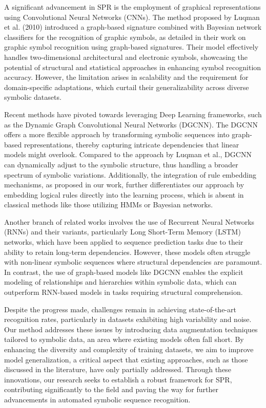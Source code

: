 \documentclass{article}
\begin{document}
A significant advancement in SPR is the employment of graphical representations using Convolutional Neural Networks (CNNs). The method proposed by Luqman et al. (2010) introduced a graph-based signature combined with Bayesian network classifiers for the recognition of graphic symbols, as detailed in their work on graphic symbol recognition using graph-based signatures. Their model effectively handles two-dimensional architectural and electronic symbols, showcasing the potential of structural and statistical approaches in enhancing symbol recognition accuracy. However, the limitation arises in scalability and the requirement for domain-specific adaptations, which curtail their generalizability across diverse symbolic datasets.

Recent methods have pivoted towards leveraging Deep Learning frameworks, such as the Dynamic Graph Convolutional Neural Networks (DGCNN). The DGCNN offers a more flexible approach by transforming symbolic sequences into graph-based representations, thereby capturing intricate dependencies that linear models might overlook. Compared to the approach by Luqman et al., DGCNN can dynamically adjust to the symbolic structure, thus handling a broader spectrum of symbolic variations. Additionally, the integration of rule embedding mechanisms, as proposed in our work, further differentiates our approach by embedding logical rules directly into the learning process, which is absent in classical methods like those utilizing HMMs or Bayesian networks.

Another branch of related works involves the use of Recurrent Neural Networks (RNNs) and their variants, particularly Long Short-Term Memory (LSTM) networks, which have been applied to sequence prediction tasks due to their ability to retain long-term dependencies. However, these models often struggle with non-linear symbolic sequences where structural dependencies are paramount. In contrast, the use of graph-based models like DGCNN enables the explicit modeling of relationships and hierarchies within symbolic data, which can outperform RNN-based models in tasks requiring structural comprehension.

Despite the progress made, challenges remain in achieving state-of-the-art recognition rates, particularly in datasets exhibiting high variability and noise. Our method addresses these issues by introducing data augmentation techniques tailored to symbolic data, an area where existing models often fall short. By enhancing the diversity and complexity of training datasets, we aim to improve model generalization, a critical aspect that existing approaches, such as those discussed in the literature, have only partially addressed. Through these innovations, our research seeks to establish a robust framework for SPR, contributing significantly to the field and paving the way for further advancements in automated symbolic sequence recognition.
\end{document}
